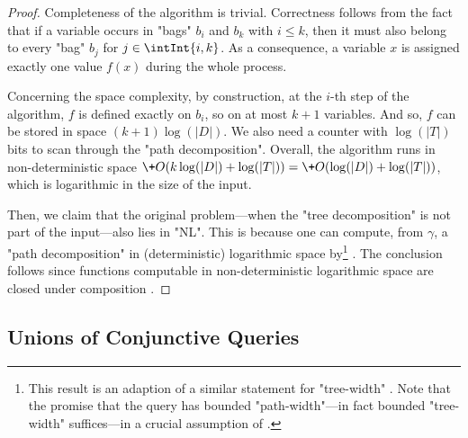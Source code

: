 \begin{proof}
	Completeness of the algorithm is trivial. Correctness follows from the fact that if
	a variable occurs in "bags" $b_i$ and $b_k$ with $i \leq k$, then it must also belong to every
	"bag" $b_j$ for $j \in \intInt{i,k}$. As a consequence, a variable $x$ is assigned 
	exactly one value $f(x)$ during the whole process. 

	Concerning the space complexity,
	by construction, at the $i$-th step of the algorithm, $f$ is defined exactly on $b_i$, so on at most $k+1$ variables.
	And so, $f$ can be stored in space $(k+1)\log(|D|)$.
	We also need a counter with $\log(|T|)$ bits to scan through the "path decomposition".
	Overall, the algorithm runs in non-deterministic space
	$\+O(k\log(|D|) + \log(|T|)) = \+O(\log(|D|) + \log(|T|))$,
	which is logarithmic in the size of the input.

	Then, we claim that the original problem---when the "tree decomposition" is not part of 
	the input---also lies in "NL". This is because one can compute, from $\gamma$, a
	"path decomposition" in (deterministic) logarithmic space by\footnote{This result is an 
	adaption of a similar statement for "tree-width" \cite[Theorem I.1, p. 143]{ElberfeldJakobyTantau2010Logspace}. Note that the promise that the query has bounded "path-width"---in fact bounded "tree-width" suffices---in a crucial assumption of  \cite[Theorem I.1, p. 143]{ElberfeldJakobyTantau2010Logspace}.} 
	\cite[Theorem 1.3, p. 2]{KintaliMunteanu2010Computing}.
	The conclusion follows since functions computable in non-deterministic logarithmic space
	are closed under composition \cite[Lemma 4.17, p. 88]{AroraBarak2009ComputationalComplexity}. 
\end{proof}

\subsection{Unions of Conjunctive Queries}
\label{sec:prelim-db-ucq}

